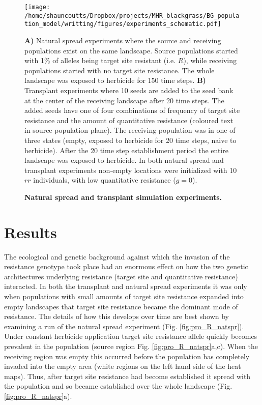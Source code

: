 \documentclass[10pt,letterpaper]{article}
\begin{document}
\newpage
\begin{figure}[!h] 
	\texttt{[image: /home/shauncoutts/Dropbox/projects/MHR\_blackgrass/BG\_population\_model/writting/figures/experiments\_schematic.pdf]}
\caption{\bf Natural spread and transplant simulation experiments.} {\bf A)} Natural spread experiments where the source and receiving populations exist on the same landscape. Source populations started with 1\% of alleles being target site resistant (i.e. $R$), while receiving populations started with no target site resistance. The whole landscape was exposed to herbicide for 150 time steps. {\bf B)} Transplant experiments where 10 seeds are added to the seed bank at the center of the receiving landscape after 20 time steps. The added seeds have one of four combinations of frequency of target site resistance and the amount of quantitative resistance (coloured text in source population plane). The receiving population was in one of three states (empty, exposed to herbicide for 20 time steps, naive to herbicide). After the 20 time step establishment period the entire landscape was exposed to herbicide. In both natural spread and transplant experiments non-empty locations were initialized with 10 $rr$ individuals, with low quantitative resistance ($g = 0$). 
\label{fig:exper}
\end{figure}

\section*{Results}
The ecological and genetic background against which the invasion of the resistance genotype took place had an enormous effect on how the two genetic architectures underlying resistance (target site and quantitative resistance) interacted. In both the transplant and natural spread experiments it was only when populations with small amounts of target site resistance expanded into empty landscapes that target site resistance became the dominant mode of resistance. The details of how this develops over time are best shown by examining a run of the natural spread experiment (Fig. \ref{fig:pro_R_natspr}). Under constant herbicide application target site resistance allele quickly becomes prevalent in the population (source region Fig. \ref{fig:pro_R_natspr}a,c). When the receiving region was empty this occurred before the population has completely invaded into the empty area (white regions on the left hand side of the heat maps). Thus, after target site resistance had become established it spread with the population and so became established over the whole landscape (Fig. \ref{fig:pro_R_natspr}a).   
\end{document}
